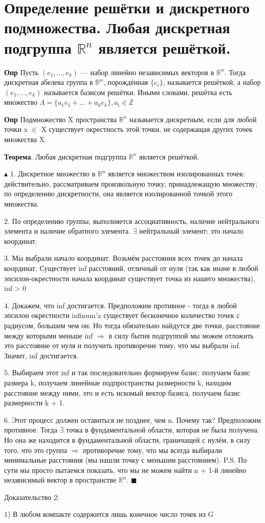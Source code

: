 \setcounter{section}{71}
\section{Определение решётки и дискретного подмножества. Любая дискретная подгруппа $\mathbb{R}^n$ является решёткой.}

\textbf{Опр} Пусть $( e_1, . . . , e_k)$ — набор линейно независимых векторов в $\mathbb{R}^n$. Тогда дискретная абелева группа в $\mathbb{R}^n$, порождённая $\{e_i\}$, называется решёткой, а набор $( e_1, . . . , e_k)$ называется базисом решётки. Иными словами, решётка есть множество $\Lambda = \{a_1 e_1 + ... + a_k e_k\}, a_i \in \mathbb{Z}$

\textbf{Опр} Подмножество X пространства $\mathbb{R}^n$ называется дискретным, если для любой точки x $\in$ X существует окрестность этой точки, не содержащая других точек множества X.

\textbf{Теорема}. Любая дискретная подгруппа $\mathbb{R}^n$ является решёткой. \par
$\blacktriangle$
1. Дискретное множество в $\mathbb{R}^n$ является множеством изолированных точек: действительно, рассматриваем произвольную точку, принадлежащую множеству; по определению дискретности, она является изолированной точкой этого множества. \par
2. По определению группы, выполняется ассоциативность, наличие нейтрального элемента и наличие обратного элемента. $\exists$ нейтральный элемент: это начало координат. \par
3. Мы выбрали начало координат. Возьмём расстояния всех точек до начала координат. Существует inf расстояний, отличный от нуля (так как иначе в любой эпсилон-окрестности начала координат существует точка из нашего множества), inf > 0 \par
4. Докажем, что inf достигается. Предположим противное - тогда в любой эпсилон окрестности infinum'a существует бесконечное количество точек с радиусом, большим чем он. Но тогда обязательно найдутся две точки, расстояние между которыми меньше inf $\Rightarrow$ в силу бытия подгруппой мы можем отложить это расстояние от нуля и получить противоречие тому, что мы выбрали inf. Значит, inf достигается. \par
5. Выбираем этот inf и так последовательно формируем базис: получаем базис размера k, получаем линейные подпространства размерности k, находим расстояние между ними, это и есть искомый вектор базиса, получаем базис размерности k + 1. \par
6. Этот процесс должен оставиться не позднее, чем n. Почему так? Предположим противное. Тогда $\exists$ точка в фундаментальной области, которая не была получена. Но она же находится в фундаментальной области, граничащей с нулём, в силу того, что это группа $\Rightarrow$ противоречие тому, что мы всегда выбирали минимальные расстояния (мы нашли точку с меньшим расстоянием). P.S. По сути мы просто пытаемся показать, что мы не можем найти n + 1-й линейно независимый вектор в пространстве $\mathbb{R}^n$.
$\blacksquare$ \par
Доказательство 2: \par
1) В любом компакте содержится лишь конечное число точек из G

